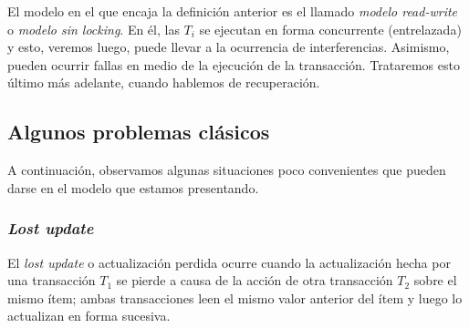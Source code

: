 \documentclass[english,titlepage]{article}
\theoremstyle{definition}
\theoremstyle{definition}
\begin{document}
El modelo en el que encaja la definición anterior es el llamado \emph{modelo
read-write} o \emph{modelo sin locking}. En él, las $T_i$ se ejecutan en forma
concurrente (entrelazada) y esto, veremos luego, puede llevar a la ocurrencia
de interferencias. Asimismo, pueden ocurrir fallas en medio de la ejecución de
la transacción. Trataremos esto último más adelante, cuando hablemos de
recuperación.

\subsection{Algunos problemas clásicos}

A continuación, observamos algunas situaciones poco convenientes que pueden
darse en el modelo que estamos presentando.

\subsubsection{\emph{Lost update}}

El \emph{lost update} o actualización perdida ocurre cuando la actualización
hecha por una transacción $T_1$ se pierde a causa de la acción de otra
transacción $T_2$ sobre el mismo ítem; ambas transacciones leen el mismo valor
anterior del ítem y luego lo actualizan en forma sucesiva.
\end{document}
